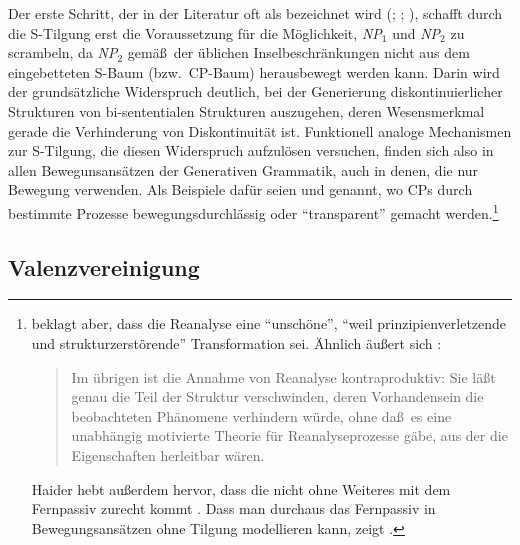 Der erste Schritt, der in der Literatur oft als  bezeichnet wird (\citealt{Haegeman:Riemsdijk:86}; \citealt[Kapitel~12]{Stechow:Sternefeld:88}; \citealt{Stechow:90}), schafft durch die S-Tilgung erst die Voraussetzung für die Möglichkeit, {\it NP$_1$} und {\it NP$_2$} zu scrambeln, da {\it NP$_2$} gemä\ss\ der üblichen Inselbeschränkungen nicht aus dem eingebetteten S-Baum (bzw.\ CP-Baum) herausbewegt werden kann. Darin wird der grundsätzliche Widerspruch deutlich, bei der Generierung diskontinuierlicher Strukturen von bi-sententialen Strukturen auszugehen, deren Wesensmerkmal gerade die Verhinderung von Diskontinuität ist. Funktionell analoge Mechanismen zur S-Tilgung, die diesen Widerspruch aufzulösen versuchen, finden sich also in allen Bewegunsansätzen der Generativen Grammatik, auch in denen, die nur Bewegung verwenden. Als Beispiele dafür seien \cite{Grewendorf:Sabel:94} und \cite{Sabel:96} genannt, wo CPs durch bestimmte Prozesse bewegungsdurchlässig oder "`transparent"' gemacht werden.\footnote{\citet[102]{Jacobs:92} beklagt aber, dass die Reanalyse eine "`unschöne"', "`weil prinzipienverletzende und strukturzerstörende"' Transformation sei. Ähnlich äu\ss ert sich \cite[257]{Haider:93}:
\begin{quote}
Im übrigen ist die Annahme von Reanalyse kontraproduktiv: Sie lä\ss t genau die Teil der Struktur verschwinden, deren Vorhandensein die beobachteten Phänomene verhindern würde, ohne da\ss\ es eine unabhängig motivierte Theorie für Reanalyseprozesse gäbe, aus der die Eigenschaften herleitbar wären.
\end{quote}
Haider hebt au\ss erdem hervor, dass die  nicht ohne Weiteres mit dem Fernpassiv zurecht kommt \citep[254]{Haider:93}. Dass man durchaus das Fernpassiv in Bewegungsansätzen ohne Tilgung modellieren kann, zeigt \citet[204ff]{Sabel:96}.}   

\subsection{Valenzvereinigung} \label{sec:valenzvereinigung}

